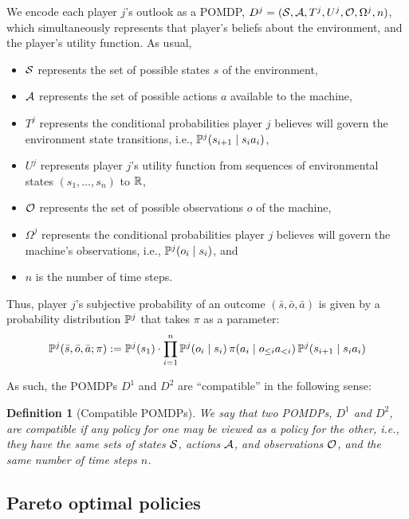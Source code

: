 \documentclass{article}  %
\newcommand{\seq}{\bar}
\newcommand{\hist}[1]{o_{\le #1}a_{<#1}}
\newtheorem{definition}[theorem]{Definition}
\begin{document}
We encode each player $j$'s outlook as a POMDP, $D^j = (\mathcal{S},\mathcal{A},T^j, U^j, \mathcal{O}, \Omega^j, n)$, which simultaneously represents that player's beliefs about the environment, and the player's utility function.  As usual,
\begin{itemize}
\item $\mathcal{S}$ represents the set of possible states $s$ of the environment,
\item $\mathcal{A}$ represents the set of possible actions $a$ available to the machine,
\item $T^j$ represents the conditional probabilities player $j$ believes will govern the environment state transitions, i.e., $\mathbb{P}^j(s_{i+1}\mid s_i a_i)$,
\item $U^j$ represents player $j$'s utility function from sequences of environmental states $(s_1,\ldots,s_n)$ to $\mathbb{R}$,
\item $\mathcal{O}$ represents the set of possible observations $o$ of the machine, 
\item $\Omega^j$ represents the conditional probabilities player $j$ believes will govern the machine's observations, i.e., $\mathbb{P}^j(o_i\mid s_i)$, and
\item $n$ is the number of time steps.
\end{itemize}
%
Thus, player $j$'s subjective probability of an outcome $(\seq s, \seq o, \seq a)$ is given by a probability distribution $\mathbb{P}^j$ that takes $\pi$ as a parameter:
\begin{equation}\label{eqn:pomdp}
\PP^j(\seq s, \seq o, \seq a ; \pi) := \PP^j(s_1) \cdot \prod_{i=1}^{n} 
\PP^j(o_i \mid s_i)\, \pi(a_i \mid \hist i)\, \PP^j(s_{i+1} \mid s_ia_i)
\end{equation}

As such, the POMDPs $D^1$ and $D^2$ are ``compatible'' in the following sense:

\begin{definition}[Compatible POMDPs]  We say that two POMDPs, $D^1$ and $D^2$, are \emph{compatible} if any policy for one may be viewed as a policy for the other, i.e., they have the same sets of states  $\mathcal{S}$, actions $\mathcal{A}$, and observations $\mathcal{O}$, and the same number of time steps $n$. 
\end{definition}

\subsection{Pareto optimal policies}
\end{document}

